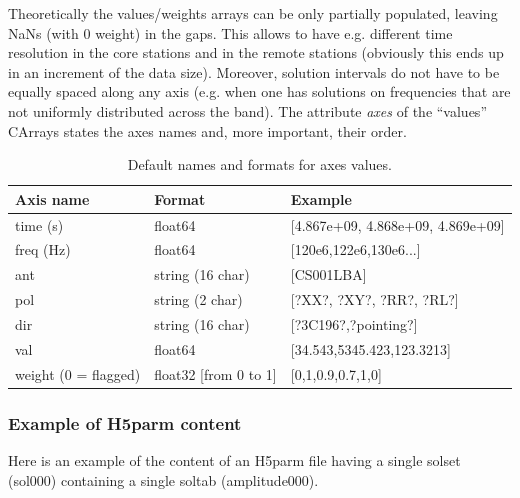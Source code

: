 Theoretically the values/weights arrays can be only partially populated, leaving NaNs (with 0 weight) in the gaps. This allows to have e.g. different time resolution in the core stations and in the remote stations (obviously this ends up in an increment of the data size). Moreover, solution intervals do not have to be equally spaced along any axis (e.g. when one has solutions on frequencies that are not uniformly distributed across the band). The attribute \textit{axes} of the ``values'' CArrays states the axes names and, more important, their order.

\begin{table}[!h]
\centering
\begin{tabular}{l l l}
\hline
\hline
Axis name & Format & Example\\
\hline
time (s) & float64 & [4.867e+09, 4.868e+09, 4.869e+09] \\
freq (Hz) & float64 & [120e6,122e6,130e6...]\\
ant & string (16 char) & [CS001LBA]\\
pol & string (2 char) & [?XX?, ?XY?, ?RR?, ?RL?]\\
dir & string (16 char)& [?3C196?,?pointing?]\\
val & float64 & [34.543,5345.423,123.3213]\\
weight (0 = flagged) & float32 [from 0 to 1] & [0,1,0.9,0.7,1,0]\\
\hline
\end{tabular}
\caption{Default names and formats for axes values. \label{losoto:tab:axes}}
\end{table}

\subsubsection{Example of H5parm content}

Here is an example of the content of an H5parm file having a single solset (sol000) containing a single soltab (amplitude000).


